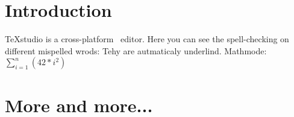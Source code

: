 \documentclass[10pt,a4paper]{article}
\begin{document}
\section{Introduction}
TeXstudio is a cross-platform \LATeX ~editor.
Here you can see the spell-checking on different mispelled wrods: Tehy are autmaticaly underlind.
Mathmode: $\sum\limits^n_{i=1}\left(42*i^2\right)$
\section{More and more...}
\end{document}
